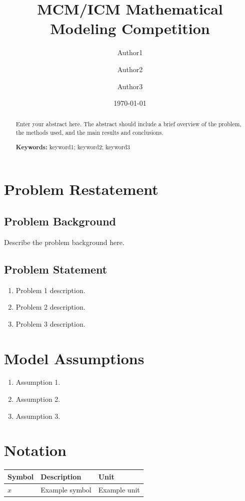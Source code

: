 \documentclass[mcmthesis]{mcmthesis}
\title{MCM/ICM Mathematical Modeling Competition}
\author{Author1 \and Author2 \and Author3}
\date{\today}
\begin{document}
\maketitle

\begin{abstract}
Enter your abstract here. The abstract should include a brief overview of the problem, the methods used, and the main results and conclusions.
\par\textbf{Keywords:} keyword1; keyword2; keyword3
\end{abstract}

\tableofcontents
\newpage

\section{Problem Restatement}
\subsection{Problem Background}
Describe the problem background here.

\subsection{Problem Statement}
\begin{enumerate}[label=(\arabic*)]
    \item Problem 1 description.
    \item Problem 2 description.
    \item Problem 3 description.
\end{enumerate}

\section{Model Assumptions}
\begin{enumerate}[label=\textbf{Assumption \arabic*:}]
    \item Assumption 1.
    \item Assumption 2.
    \item Assumption 3.
\end{enumerate}

\section{Notation}
\begin{table}[H]
\centering
\begin{tabular}{lll}
\toprule
\textbf{Symbol} & \textbf{Description} & \textbf{Unit} \\
\midrule
$x$ & Example symbol & Example unit \\
\bottomrule
\end{tabular}
\end{table}
\end{document}
